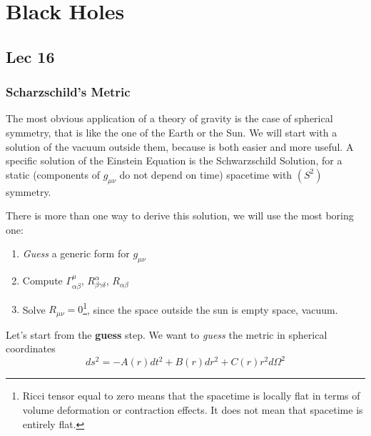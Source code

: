 \chapter{Black Holes}
\section{Lec 16}
\subsection{Scharzschild's Metric}
The most obvious application of a theory of gravity is the case of spherical symmetry, that is like the one of the Earth or the Sun. We will start with a solution of the vacuum outside them, because is both easier and more useful. 
A specific solution of the Einstein Equation is the Schwarzschild Solution, for a static (components of $g_{\mu \nu }$ do not depend on time) spacetime with $\left( S^{2} \right)$ symmetry.\par
There is more than one way to derive this solution, we will use the most boring one:
\begin{enumerate}
\item \emph{Guess} a generic form for $g_{\mu \nu } $
\item Compute $\Gamma ^{\mu }_{\alpha \beta }$, $R^{\alpha }_{\beta \gamma \delta }$, $R_{\alpha \beta }$
\item Solve $R_{\mu \nu } = 0$\footnote{Ricci tensor equal to zero means that the spacetime is locally flat in terms of volume deformation or contraction effects. It does not mean that spacetime is entirely flat.}, since the space outside the sun is empty space, vacuum.
\end{enumerate}

Let's start from the \textbf{guess} step.
We want to \emph{guess} the metric in spherical coordinates 
\begin{equation}\label{eq:polarmetric}
ds^{2}= -A\left( r \right) dt^{2} + B\left( r \right) dr^{2} + C\left( r \right) r^{2}d\Omega ^{2}
\end{equation}

